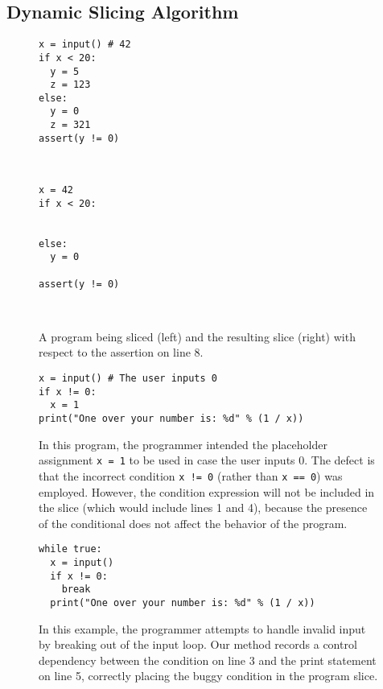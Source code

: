 \documentclass[conference]{IEEEtran}
\newcommand\lt[1]{{\lstinline|#1|}}
\begin{document}
\subsection{Dynamic Slicing Algorithm}
\label{sec-slice-algorithm}

\begin{figure}
\begin{lrbox}{\verbsavebox}
\begin{lstlisting}[xrightmargin=0.5\linewidth]
x = input() # 42
if x < 20:
  y = 5
  z = 123
else:
  y = 0
  z = 321
assert(y != 0)
\end{lstlisting}
\end{lrbox}
~ \hfill
{}
\hfill
\begin{lrbox}{\verbsavebox}
\begin{lstlisting}[xrightmargin=0.5\linewidth]
x = 42
if x < 20:


else:
  y = 0

assert(y != 0)
\end{lstlisting}
\end{lrbox}
\hfill
~
\caption{
  A program being sliced (left) and the resulting slice (right) with
  respect to the assertion on line 8.
}
\label{fig-slice-example}
\end{figure}

\begin{figure}
\begin{lstlisting}
x = input() # The user inputs 0
if x != 0:
  x = 1
print("One over your number is: %d" % (1 / x))
\end{lstlisting}
\caption{In this program, the programmer intended the placeholder
  assignment \lt{x = 1} to be used in case the user inputs 0.
  The defect is that the
  incorrect condition \lt{x != 0} (rather than \lt{x == 0}) was employed. However, the
  condition expression will not be included in the slice (which would include
  lines 1 and 4), because the presence of
  the conditional does not affect the behavior of the program.
}
\label{fig-slice-downside-example}
\end{figure}

\begin{figure}
\begin{lstlisting}
while true:
  x = input()
  if x != 0:
    break
  print("One over your number is: %d" % (1 / x))
\end{lstlisting}
\caption{
  In this example, the programmer attempts to handle invalid input by
  breaking out of the input loop. Our method
  records a control dependency between the condition on line 3 and the
  print statement on line 5, correctly placing the buggy condition in the
  program slice.
}
\label{fig-early-break}
\end{figure}
\end{document}
